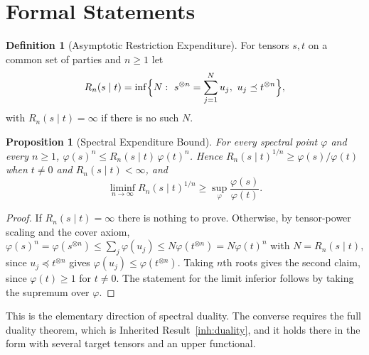 \documentclass[11pt,letterpaper]{report}
\theoremstyle{plain}
\newtheorem{proposition}[theorem]{Proposition}
\theoremstyle{definition}
\newtheorem{definition}[theorem]{Definition}
\theoremstyle{remark}
\begin{document}
\section{Formal Statements}

\begin{definition}[Asymptotic Restriction Expenditure]
For tensors $s,t$ on a common set of parties and $n\ge1$ let
\[
R_n(s\mid t)=\inf\Bigl\{N:\ s^{\otimes n}=\sum_{j=1}^{N}u_j,\ u_j\preceq t^{\otimes n}\Bigr\},
\]
with $R_n(s\mid t)=\infty$ if there is no such $N$.
\end{definition}

\begin{proposition}[Spectral Expenditure Bound]\label{pr:expend}
For every spectral point $\varphi$ and every $n\ge1$, $\varphi(s)^n\le R_n(s\mid t)\,\varphi(t)^n$. Hence $R_n(s\mid t)^{1/n}\ge\varphi(s)/\varphi(t)$ when $t\ne0$ and $R_n(s\mid t)<\infty$, and
\[
\liminf_{n\to\infty}R_n(s\mid t)^{1/n}\ge\sup_{\varphi}\frac{\varphi(s)}{\varphi(t)}.
\]
\end{proposition}
\begin{proof}
If $R_n(s\mid t)=\infty$ there is nothing to prove. Otherwise, by tensor-power scaling and the cover axiom, $\varphi(s)^n=\varphi(s^{\otimes n})\le\sum_j\varphi(u_j)\le N\varphi(t^{\otimes n})=N\varphi(t)^n$ with $N=R_n(s\mid t)$, since $u_j\preceq t^{\otimes n}$ gives $\varphi(u_j)\le\varphi(t^{\otimes n})$. Taking $n$th roots gives the second claim, since $\varphi(t)\ge1$ for $t\ne0$. The statement for the limit inferior follows by taking the supremum over $\varphi$.
\end{proof}

This is the elementary direction of spectral duality. The converse requires the full duality theorem, which is Inherited Result~\ref{inh:duality}, and it holds there in the form with several target tensors and an upper functional.
\end{document}
